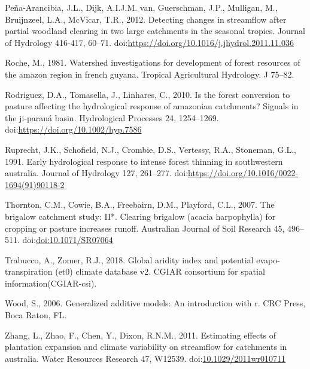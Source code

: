 \documentclass[]{elsarticle} %
\begin{document}
\leavevmode\hypertarget{ref-pena-arancibia2012}{}%
Peña-Arancibia, J.L., Dijk, A.I.J.M. van, Guerschman, J.P., Mulligan,
M., Bruijnzeel, L.A., McVicar, T.R., 2012. Detecting changes in
streamflow after partial woodland clearing in two large catchments in
the seasonal tropics. Journal of Hydrology 416-417, 60--71.
doi:\href{https://doi.org/https://doi.org/10.1016/j.jhydrol.2011.11.036}{https://doi.org/10.1016/j.jhydrol.2011.11.036}

\leavevmode\hypertarget{ref-roche1981}{}%
Roche, M., 1981. Watershed investigations for development of forest
resources of the amazon region in french guyana. Tropical Agricultural
Hydrology. J 75--82.

\leavevmode\hypertarget{ref-rodriguez2010}{}%
Rodriguez, D.A., Tomasella, J., Linhares, C., 2010. Is the forest
conversion to pasture affecting the hydrological response of amazonian
catchments? Signals in the ji-paraná basin. Hydrological Processes 24,
1254--1269.
doi:\href{https://doi.org/https://doi.org/10.1002/hyp.7586}{https://doi.org/10.1002/hyp.7586}

\leavevmode\hypertarget{ref-ruprechtetal1991}{}%
Ruprecht, J.K., Schofield, N.J., Crombie, D.S., Vertessy, R.A.,
Stoneman, G.L., 1991. Early hydrological response to intense forest
thinning in southwestern australia. Journal of Hydrology 127, 261--277.
doi:\href{https://doi.org/https://doi.org/10.1016/0022-1694(91)90118-2}{https://doi.org/10.1016/0022-1694(91)90118-2}

\leavevmode\hypertarget{ref-thornton2007}{}%
Thornton, C.M., Cowie, B.A., Freebairn, D.M., Playford, C.L., 2007. The
brigalow catchment study: II*. Clearing brigalow (acacia harpophylla)
for cropping or pasture increases runoff. Australian Journal of Soil
Research 45, 496--511.
doi:\href{https://doi.org/doi:10.1071/SR07064}{doi:10.1071/SR07064}

\leavevmode\hypertarget{ref-trabucco2018}{}%
Trabucco, A., Zomer, R.J., 2018. Global aridity index and potential
evapo-transpiration (et0) climate database v2. CGIAR consortium for
spatial information(CGIAR-csi).

\leavevmode\hypertarget{ref-wood2006}{}%
Wood, S., 2006. Generalized additive models: An introduction with r. CRC
Press, Boca Raton, FL.

\leavevmode\hypertarget{ref-zhang2011}{}%
Zhang, L., Zhao, F., Chen, Y., Dixon, R.N.M., 2011. Estimating effects
of plantation expansion and climate variability on streamflow for
catchments in australia. Water Resources Research 47, W12539.
doi:\href{https://doi.org/10.1029/2011wr010711}{10.1029/2011wr010711}
\end{document}
